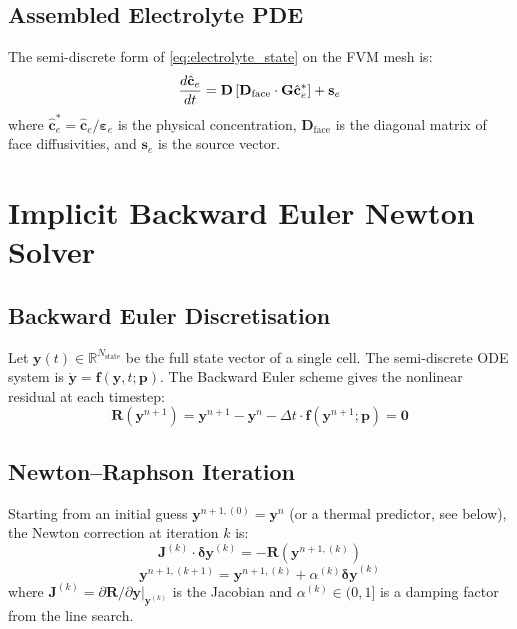 \subsection{Assembled Electrolyte PDE}

The semi-discrete form of \cref{eq:electrolyte_state} on the FVM mesh is:
\begin{equation}
  \dfrac{d \hat{\mathbf{c}}_e}{dt} = \mathbf{D}\left[\mathbf{D}_\text{face} \cdot \mathbf{G} \hat{\mathbf{c}}_e^*\right] + \mathbf{s}_e
  \label{eq:fvm_semidiscrete}
\end{equation}
where $\hat{\mathbf{c}}_e^* = \hat{\mathbf{c}}_e / \boldsymbol{\varepsilon}_e$ is the physical concentration, $\mathbf{D}_\text{face}$ is the diagonal matrix of face diffusivities, and $\mathbf{s}_e$ is the source vector.

\section{Implicit Backward Euler Newton Solver}
\label{sec:newton_solver}

\subsection{Backward Euler Discretisation}

Let $\mathbf{y}(t) \in \mathbb{R}^{N_\text{state}}$ be the full state vector of a single cell. The semi-discrete ODE system is $\dot{\mathbf{y}} = \mathbf{f}(\mathbf{y}, t; \mathbf{p})$. The Backward Euler scheme gives the nonlinear residual at each timestep:
\begin{equation}
  \mathbf{R}(\mathbf{y}^{n+1}) = \mathbf{y}^{n+1} - \mathbf{y}^n - \Delta t \cdot \mathbf{f}(\mathbf{y}^{n+1}; \mathbf{p}) = \mathbf{0}
  \label{eq:be_residual}
\end{equation}

\subsection{Newton--Raphson Iteration}

Starting from an initial guess $\mathbf{y}^{n+1,(0)} = \mathbf{y}^n$ (or a thermal predictor, see below), the Newton correction at iteration $k$ is:
\begin{equation}
  \mathbf{J}^{(k)} \cdot \boldsymbol{\delta\mathbf{y}}^{(k)} = -\mathbf{R}(\mathbf{y}^{n+1,(k)})
  \label{eq:newton_system}
\end{equation}
\begin{equation}
  \mathbf{y}^{n+1,(k+1)} = \mathbf{y}^{n+1,(k)} + \alpha^{(k)} \boldsymbol{\delta\mathbf{y}}^{(k)}
  \label{eq:newton_update}
\end{equation}
where $\mathbf{J}^{(k)} = \partial \mathbf{R}/\partial \mathbf{y}|_{\mathbf{y}^{(k)}}$ is the Jacobian and $\alpha^{(k)} \in (0,1]$ is a damping factor from the line search.


